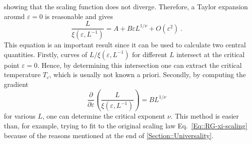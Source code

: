 	showing that the scaling function does not diverge. Therefore, a Taylor expansion around $\varepsilon =	0$ is reasonable and gives
	\begin{equation} \label{Equation::FSS-Scaling-L/xi}
		\frac{L}{\xi(\varepsilon, L^{-1})} =	A + B \varepsilon L^{1/\nu} + O(\varepsilon^2)~. 
	\end{equation}
	This equation is an important result since it can be used to calculate two central quantities. Firstly, curves of $L/\xi(\varepsilon, L^{-1})$ for different $L$ intersect at the critical point $\varepsilon = 0$. Hence, by determining this intersection one can extract the critical temperature $T_c$, which is usually not known a priori. Secondly, by computing the gradient
	\begin{equation}
		\frac{\partial}{\partial \varepsilon} \left(\frac{L}{\xi(\varepsilon, L^{-1})}\right) =	B L^{1/\nu}
	\end{equation}
	for various $L$, one can determine the critical exponent $\nu$. This method is easier than, for example, trying to fit to the original scaling law Eq.~\eqref{Eq::RG-xi-scaling} because of the reasons mentioned at the end of \autoref{Section::Universality}.
